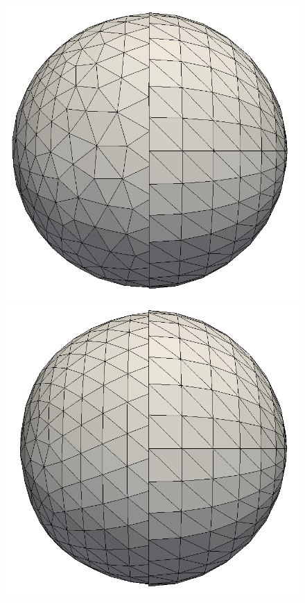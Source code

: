 \documentclass[letter,11pt]{article}
\begin{document}
\begin{figure}
  \centering
  \begin{minipage}{.25\textwidth}
    \centering
    \includegraphics[width=1\linewidth]{../image/sphere_patch.png}
  \end{minipage} 
  \begin{minipage}{0.25\textwidth}
    \centering
    \includegraphics[width=1\linewidth]{../image/sphere_current.png}

\end{minipage}
\end{figure}
\end{document}
